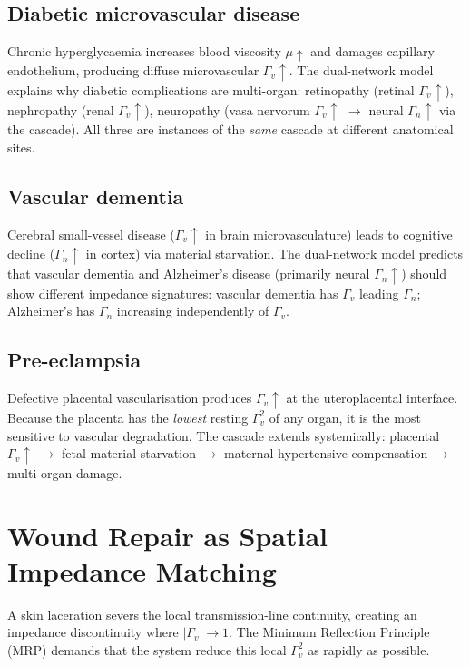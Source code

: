 \documentclass[aps,pre,twocolumn,superscriptaddress,floatfix]{revtex4-2}
\begin{document}
\subsection{Diabetic microvascular disease}
\label{sec:diabetic-micro}

Chronic hyperglycaemia increases blood viscosity
$\mu\!\uparrow$ and damages capillary endothelium,
producing diffuse microvascular $\Gamma_v\!\uparrow$.
The dual-network model explains why diabetic
complications are multi-organ:
retinopathy (retinal $\Gamma_v\!\uparrow$),
nephropathy (renal $\Gamma_v\!\uparrow$),
neuropathy (vasa nervorum $\Gamma_v\!\uparrow$
$\to$ neural $\Gamma_n\!\uparrow$ via the cascade).
All three are instances of the \emph{same} cascade
at different anatomical sites.


\subsection{Vascular dementia}
\label{sec:vasc-dementia}

Cerebral small-vessel disease
($\Gamma_v\!\uparrow$ in brain microvasculature)
leads to cognitive decline
($\Gamma_n\!\uparrow$ in cortex) via material
starvation.
The dual-network model predicts that vascular
dementia and Alzheimer's disease (primarily neural
$\Gamma_n\!\uparrow$) should show different impedance
signatures:
vascular dementia has $\Gamma_v$ leading $\Gamma_n$;
Alzheimer's has $\Gamma_n$ increasing independently
of $\Gamma_v$.


\subsection{Pre-eclampsia}
\label{sec:preeclampsia}

Defective placental vascularisation produces
$\Gamma_v\!\uparrow$ at the uteroplacental interface.
Because the placenta has the \emph{lowest} resting
$\Gamma_v^2$ of any organ, it is the most sensitive
to vascular degradation.
The cascade extends systemically:
placental $\Gamma_v\!\uparrow$ $\to$ fetal material
starvation $\to$ maternal hypertensive compensation
$\to$ multi-organ damage.


\section{Wound Repair as Spatial Impedance Matching}
\label{sec:wound}

A skin laceration severs the local transmission-line
continuity, creating an impedance discontinuity where
$|\Gamma_v| \to 1$.
The Minimum Reflection Principle (MRP) demands that
the system reduce this local $\Gamma_v^2$ as rapidly
as possible.
\end{document}
